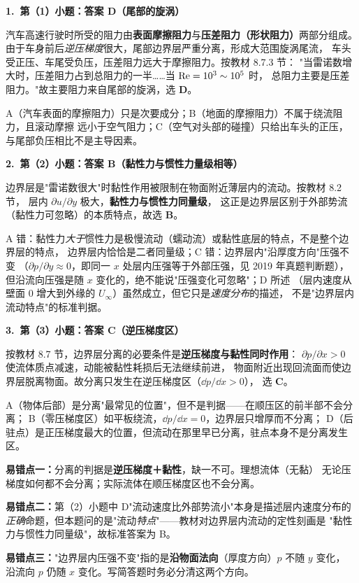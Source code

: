 \begin{jie}
\textbf{1.\ 第（1）小题：答案 D（尾部的旋涡）}

汽车高速行驶时所受的阻力由\textbf{表面摩擦阻力}与\textbf{压差阻力（形状阻力）}两部分组成。
由于车身前后\emph{逆压梯度}很大，尾部边界层严重分离，形成大范围旋涡尾流，
车头受正压、车尾受负压，压差阻力远大于摩擦阻力。按教材 8.7.3 节：
"当雷诺数增大时，压差阻力占到总阻力的一半……当 $\mathrm{Re}=10^3\sim10^5$ 时，
总阻力主要是压差阻力。"故主要阻力来自尾部的旋涡，选 \textbf{D}。

A（汽车表面的摩擦阻力）只是次要成分；B（地面的摩擦阻力）不属于绕流阻力，且滚动摩擦
远小于空气阻力；C（空气对头部的碰撞）只给出车头的正压，与尾部负压相比不是主导因素。

\textbf{2.\ 第（2）小题：答案 B（黏性力与惯性力量级相等）}

边界层是"雷诺数很大"时黏性作用被限制在物面附近薄层内的流动。按教材 8.2 节，
层内 $\partial u/\partial y$ 极大，\textbf{黏性力与惯性力同量级}，
这正是边界层区别于外部势流（黏性力可忽略）的本质特点，故选 \textbf{B}。

A 错：黏性力\emph{大于}惯性力是极慢流动（蠕动流）或黏性底层的特点，不是整个边界层的特点，
边界层内恰恰是二者同量级；C 错：边界层内"沿厚度方向"压强不变
（$\partial p/\partial y\approx0$，即同一 $x$ 处层内压强等于外部压强，见 2019 年真题判断题），
但沿流向压强是随 $x$ 变化的，绝不能说"压强变化可忽略"；D 所述
（层内速度从壁面 0 增大到外缘的 $U_\infty$）虽然成立，但它只是\emph{速度分布}的描述，
不是"边界层内流动特点"的标准判据。

\textbf{3.\ 第（3）小题：答案 C（逆压梯度区）}

按教材 8.7 节，边界层分离的必要条件是\textbf{逆压梯度与黏性同时作用}：
$\partial p/\partial x>0$ 使流体质点减速，动能被黏性耗损后无法继续前进，
物面附近出现回流面而使边界层脱离物面。故分离只发生在逆压梯度区（$\dd p/\dd x>0$），
选 \textbf{C}。

A（物体后部）是分离"最常见的位置"，但不是判据——在顺压区的前半部不会分离；
B（零压梯度区）如平板绕流，$\dd p/\dd x=0$，边界层只增厚而不分离；
D（后驻点）是正压梯度最大的位置，但流动在那里早已分离，驻点本身不是分离发生区。
\end{jie}

\begin{yicuo}
\textbf{易错点一：}分离的判据是\textbf{逆压梯度＋黏性}，缺一不可。理想流体（无黏）
无论压梯度如何都不会分离；实际流体在顺压梯度区也不会分离。

\textbf{易错点二：}第（2）小题中 D"流动速度比外部势流小"本身是描述层内速度分布的
\emph{正确}命题，但本题问的是"流动\emph{特点}"——教材对边界层内流动的定性刻画是
"黏性力与惯性力同量级"，故标准答案为 B。

\textbf{易错点三：}"边界层内压强不变"指的是\textbf{沿物面法向}（厚度方向）$p$ 不随 $y$ 变化，
沿流向 $p$ 仍随 $x$ 变化。写简答题时务必分清这两个方向。
\end{yicuo}

